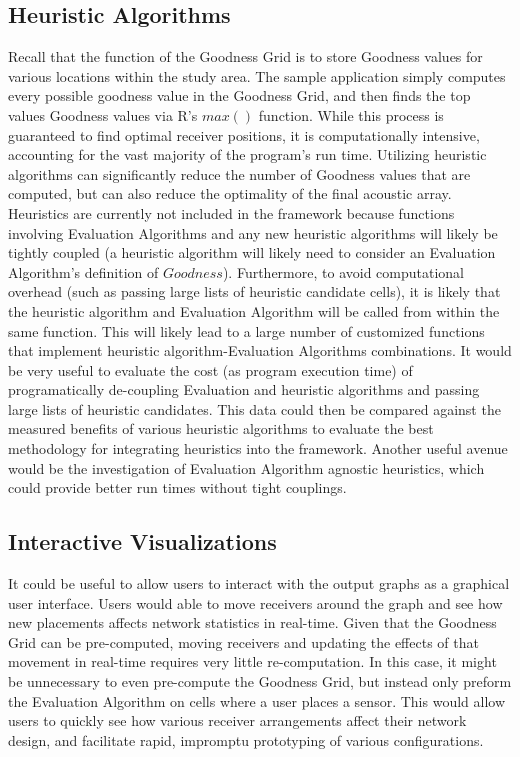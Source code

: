 \subsection{Heuristic Algorithms}
\label{heuristics}
Recall that the function of the Goodness Grid is to store Goodness values for various locations within the study area.  The sample application simply computes every possible goodness value in the Goodness Grid, and then finds the top values Goodness values via R's $max()$ function.  While this process is guaranteed to find optimal receiver positions, it is computationally intensive, accounting for the vast majority of the program's run time.  Utilizing heuristic algorithms can significantly reduce the number of Goodness values that are computed, but can also reduce the optimality of the final acoustic array.  Heuristics are currently not included in the framework because functions involving Evaluation Algorithms and any new heuristic algorithms will likely be tightly coupled (a heuristic algorithm will likely need to consider an Evaluation Algorithm's definition of $Goodness$).  Furthermore, to avoid computational overhead (such as passing large lists of heuristic candidate cells), it is likely that the heuristic algorithm and Evaluation Algorithm will be called from within the same function.  This will likely lead to a large number of customized functions that implement heuristic algorithm-Evaluation Algorithms combinations.  It would be very useful to evaluate the cost (as program execution time) of programatically de-coupling Evaluation and heuristic algorithms and passing large lists of heuristic candidates.  This data could then be compared against the measured benefits of various heuristic algorithms to evaluate the best methodology for integrating heuristics into the framework.  Another useful avenue would be the investigation of Evaluation Algorithm agnostic heuristics, which could provide better run times without tight couplings.

\subsection{Interactive Visualizations}
It could be useful to allow users to interact with the output graphs as a graphical user interface.  Users would able to move receivers around the graph and see how new placements affects network statistics in real-time.  Given that the Goodness Grid can be pre-computed, moving receivers and updating the effects of that movement in real-time requires very little re-computation.  In this case, it might be unnecessary to even pre-compute the Goodness Grid, but instead only preform the Evaluation Algorithm on cells where a user places a sensor.  This would allow users to quickly see how various receiver arrangements affect their network design, and facilitate rapid, impromptu prototyping of various configurations.  

